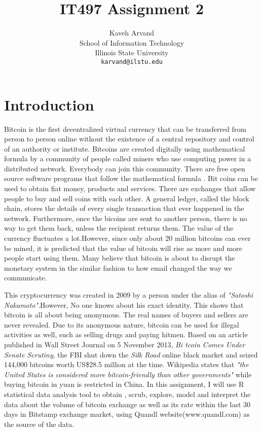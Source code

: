 \documentclass{article}\usepackage[]{graphicx}\usepackage[]{color}
\begin{document}
\title { IT497 Assignment 2 } 
\author { Kaveh Arvand 
\\ School of Information Technology 
\\ Illinois State University
\\
\texttt{karvand@ilstu.edu}} 
\maketitle
\section{Introduction}

Bitcoin is the first decentralized virtual currency that can be transferred from person to person 
online without the 
existence of a central repository and control of an authority or institute. Bitcoins are created 
digitally using 
mathematical formula by a community of people called miners who use computing power in a distributed 
network. 
Everybody can join this community. There are free open source software programs that follow the 
mathematical formula
. Bit coins can be used to obtain fiat money, products and services. There are exchanges that allow 
people to buy 
and sell coins with each other. A general ledger, called the block chain, stores the details of every single 
transaction that ever happened in the network. Furthermore,  once the bicoins are sent to another person, there is 
no way to get them back, unless the recipient returns them. The value of the currency fluctuates a lot.However, 
since only about 20 million bitcoins can ever be mined, it is predicted that the value of bitcoin will rise as more 
and more people start using them. Many believe that bitcoin is about to disrupt the monetary system in the similar 
fashion to how email changed the way we communicate.

This cryptocurrency was created in 2009 by a person under the alias of \textit{"Satoshi Nakamoto"}.However, No one 
knows about his exact identity. This shows that bitcoin is all about being anonymous. The real names of buyers and 
sellers are never revealed. Due to its anonymous nature, bitcoin can be used for illegal activities as well, such 
as 
selling drugs and paying hitmen. Based on an article published in Wall Street Journal on 5 November 2013, \textit{Bi
tcoin Comes Under Senate Scrutiny}, the FBI shut down the \textit{Silk Road} online black market and seized 144,000 
bitcoins worth US\$28.5 million at the time. Wikipedia states that \textit{"the United States is considered more 
bitcoin-friendly than other governments"} while buying bitcoin in yuan is restricted in China. 
In this assignment, I will use R statistical data analysis tool to obtain
, scrub, explore, model and interpret the data about the volume of 
bitcoin exchange as well as its rate within the last 30 days in Bitstamp 
exchange market, using Quandl website(www.quandl.com) as the source of the data.
\end{document}
